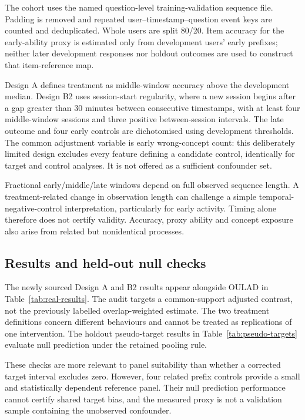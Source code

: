 The cohort uses the named question-level training-validation sequence file. Padding is removed and repeated user--timestamp--question event keys are counted and deduplicated. Whole users are split 80/20. Item accuracy for the early-ability proxy is estimated only from development users' early prefixes; neither later development responses nor holdout outcomes are used to construct that item-reference map.

Design A defines treatment as middle-window accuracy above the development median. Design B2 uses session-start regularity, where a new session begins after a gap greater than 30 minutes between consecutive timestamps, with at least four middle-window sessions and three positive between-session intervals. The late outcome and four early controls are dichotomised using development thresholds. The common adjustment variable is early wrong-concept count: this deliberately limited design excludes every feature defining a candidate control, identically for target and control analyses. It is not offered as a sufficient confounder set.

Fractional early/middle/late windows depend on full observed sequence length. A treatment-related change in observation length can challenge a simple temporal-negative-control interpretation, particularly for early activity. Timing alone therefore does not certify validity. Accuracy, proxy ability and concept exposure also arise from related but nonidentical processes.

\subsection{Results and held-out null checks}

The newly sourced Design A and B2 results appear alongside OULAD in Table~\ref{tab:real-results}. The audit targets a common-support adjusted contrast, not the previously labelled overlap-weighted estimate. The two treatment definitions concern different behaviours and cannot be treated as replications of one intervention. The holdout pseudo-target results in Table~\ref{tab:pseudo-targets} evaluate null prediction under the retained pooling rule.



These checks are more relevant to panel suitability than whether a corrected target interval excludes zero. However, four related prefix controls provide a small and statistically dependent reference panel. Their null prediction performance cannot certify shared target bias, and the measured proxy is not a validation sample containing the unobserved confounder.


